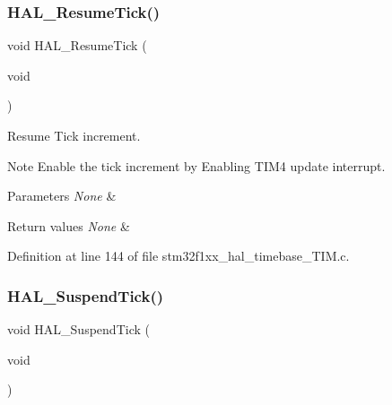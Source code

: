 \mbox{\label{group__HAL__TimeBase_ga24e0ee9dae1ec0f9d19200f5575ff790}} 
\subsubsection{\texorpdfstring{H\+A\+L\+\_\+\+Resume\+Tick()}{HAL\_ResumeTick()}}
{\footnotesize\ttfamily void H\+A\+L\+\_\+\+Resume\+Tick (\begin{DoxyParamCaption}\item[{void}]{ }\end{DoxyParamCaption})}



Resume Tick increment. 

\begin{DoxyNote}{Note}
Enable the tick increment by Enabling T\+I\+M4 update interrupt. 
\end{DoxyNote}

\begin{DoxyParams}{Parameters}
{\em None} & \\
\hline
\end{DoxyParams}

\begin{DoxyRetVals}{Return values}
{\em None} & \\
\hline
\end{DoxyRetVals}


Definition at line 144 of file stm32f1xx\+\_\+hal\+\_\+timebase\+\_\+\+T\+I\+M.\+c.

\mbox{\label{group__HAL__TimeBase_gaaf651af2afe688a991c657f64f8fa5f9}} 
\subsubsection{\texorpdfstring{H\+A\+L\+\_\+\+Suspend\+Tick()}{HAL\_SuspendTick()}}
{\footnotesize\ttfamily void H\+A\+L\+\_\+\+Suspend\+Tick (\begin{DoxyParamCaption}\item[{void}]{ }\end{DoxyParamCaption})}



